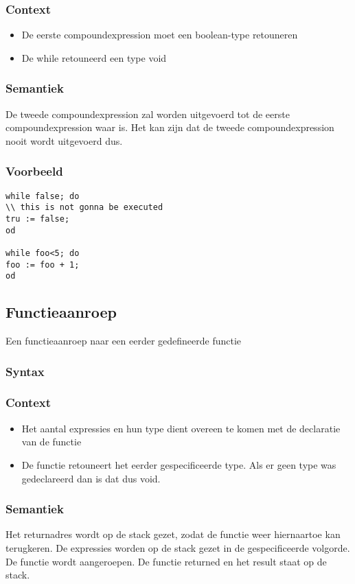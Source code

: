\documentclass[]{article}
\begin{document}
\subsubsection{Context}
\begin{itemize}
\item De eerste compoundexpression moet een boolean-type retouneren
\item De while retouneerd een type void
\end{itemize}
\subsubsection{Semantiek}
De tweede compoundexpression zal worden uitgevoerd tot de eerste compoundexpression waar is. Het kan zijn dat de tweede compoundexpression nooit wordt uitgevoerd dus.
\subsubsection{Voorbeeld}
\begin{lstlisting}[style=SELMA]
while false; do 
\\ this is not gonna be executed
tru := false;
od

while foo<5; do
foo := foo + 1;
od
\end{lstlisting}

\subsection{Functieaanroep}
Een functieaanroep naar een eerder gedefineerde functie
\subsubsection{Syntax}

\subsubsection{Context}
\begin{itemize}
\item Het aantal expressies en hun type dient overeen te komen met de declaratie van de functie
\item De functie retouneert het eerder gespecificeerde type. Als er geen type was gedeclareerd dan is dat dus void.
\end{itemize}
\subsubsection{Semantiek}
Het returnadres wordt op de stack gezet, zodat de functie weer hiernaartoe kan terugkeren.
De expressies worden op de stack gezet in de gespecificeerde volgorde.
De functie wordt aangeroepen.
De functie returned en het result staat op de stack.
\end{document}
